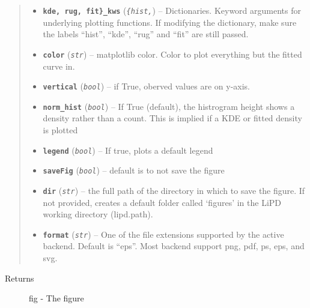 \documentclass[letterpaper,10pt,english]{sphinxmanual}
\begin{document}
\begin{fulllineitems}
\begin{fulllineitems}
\begin{quote}
\begin{description}
\begin{itemize}
\item {} 
\textbf{\texttt{kde, rug, fit\}\_kws}} (\emph{\texttt{\{hist,}}) -- Dictionaries. Keyword arguments for
underlying plotting functions. If modifying the dictionary, make
sure the labels ``hist'', ``kde'', ``rug'' and ``fit'' are still passed.

\item {} 
\textbf{\texttt{color}} (\emph{\texttt{str}}) -- matplotlib color. Color to plot everything but the
fitted curve in.

\item {} 
\textbf{\texttt{vertical}} (\emph{\texttt{bool}}) -- if True, oberved values are on y-axis.

\item {} 
\textbf{\texttt{norm\_hist}} (\emph{\texttt{bool}}) -- If True (default), the histrogram height shows
a density rather than a count. This is implied if a KDE or
fitted density is plotted

\item {} 
\textbf{\texttt{legend}} (\emph{\texttt{bool}}) -- If true, plots a default legend

\item {} 
\textbf{\texttt{saveFig}} (\emph{\texttt{bool}}) -- default is to not save the figure

\item {} 
\textbf{\texttt{dir}} (\emph{\texttt{str}}) -- the full path of the directory in which to save the figure.
If not provided, creates a default folder called `figures' in the
LiPD working directory (lipd.path).

\item {} 
\textbf{\texttt{format}} (\emph{\texttt{str}}) -- One of the file extensions supported by the active
backend. Default is ``eps''. Most backend support png, pdf, ps, eps,
and svg.

\end{itemize}

\end{description}\end{quote}
\begin{description}
\item[{Returns}] \leavevmode
fig - The figure

\end{description}

\end{fulllineitems}


\end{fulllineitems}
\end{document}
